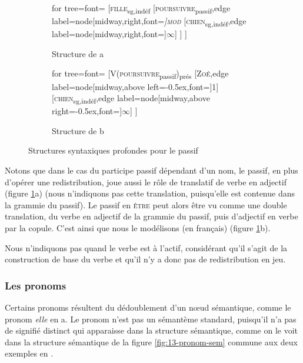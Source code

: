 \begin{figure}
	\begin{subfigure}[b]{0.5\textwidth}
		\centering
		\begin{forest} for tree={font=\normalfont}
			[\textsc{fille}\textsubscript{sg,indéf}
				[\textsc{poursuivre}\textsubscript{passif},edge label={node[midway,right,font=\footnotesize\itshape]{\textsc{mod}}}
					[\textsc{chien}\textsubscript{sg,indéf},edge label={node[midway,right,font=\footnotesize]{$\infty$}}]
				]
			]
		\end{forest}
		\caption{Structure de a}
	\end{subfigure}%
	\hfill
	\begin{subfigure}[b]{0.5\textwidth}
		\centering
		\begin{forest} for tree={font=\normalfont}
			[V(\textsc{poursuivre}\textsubscript{passif})\textsubscript{prés}
				[\textsc{Zoé},edge label={node[midway,above left=-0.5ex,font=\footnotesize]{1}}]
				[\textsc{chien}\textsubscript{sg,indéf},edge label={node[midway,above right=-0.5ex,font=\footnotesize]{$\infty$}}]
			]
		\end{forest}
		\caption{Structure de b}
	\end{subfigure}
\caption{Structures syntaxiques profondes pour le passif\label{fig:13-passif}}
\end{figure}

Notons que dans le cas du participe passif dépendant d’un nom, le passif, en plus d’opérer une redistribution, joue aussi le rôle de translatif de verbe en adjectif (figure \ref{fig:13-passif}a) (nous n’indiquons pas cette translation, puisqu’elle est contenue dans la grammie du passif). Le passif en \textsc{être} peut alors être vu comme une double translation, du verbe en adjectif de la grammie du passif, puis d’adjectif en verbe par la copule. C’est ainsi que nous le modélisons (en français) (figure \ref{fig:13-passif}b).

Nous n’indiquons pas quand le verbe est à l’actif, considérant qu’il s’agit de la construction de base du verbe et qu’il n’y a donc pas de redistribution en jeu.

\subsubsection{Les pronoms}
Certains pronoms résultent du dédoublement d’un nœud sémantique, comme le pronom \textit{elle} en a. Le pronom n’est pas un sémantème standard, puisqu’il n’a pas de signifié distinct qui apparaisse dans la structure sémantique, comme on le voit dans la structure sémantique de la figure \ref{fig:13-pronom-sem} commune aux deux exemples en .


